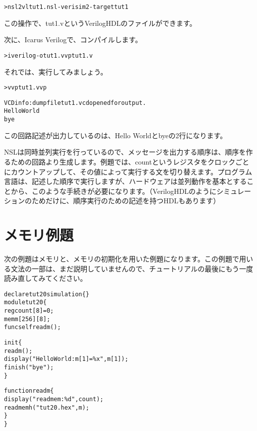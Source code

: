 \begin{reviewcmd}
\begin{alltt}
\textgreater{} nsl2vl tut1.nsl -verisim2 -target tut1
\end{alltt}
\end{reviewcmd}

この操作で、tut1.vというVerilogHDLのファイルができます。

次に、Icarus Verilogで、コンパイルします。

\begin{reviewcmd}
\begin{alltt}
\textgreater{} iverilog -o tut1.vvp tut1.v
\end{alltt}
\end{reviewcmd}

それでは、実行してみましょう。

\begin{reviewcmd}
\begin{alltt}
\textgreater{} vvp tut1.vvp

VCD info: dumpfile tut1.vcd opened for output.
Hello World
bye
\end{alltt}
\end{reviewcmd}

この回路記述が出力しているのは、Hello Worldとbyeの2行になります。

NSLは同時並列実行を行っているので、メッセージを出力する順序は、順序を作るための回路より生成します。例題では、countというレジスタをクロックごとにカウントアップして、その値によって実行する文を切り替えます。プログラム言語は、記述した順序で実行しますが、ハードウェアは並列動作を基本とすることから、このような手続きが必要になります。（VerilogHDLのようにシミュレーションのためだけに、順序実行のための記述を持つHDLもあります）

\section{メモリ例題}

次の例題はメモリと、メモリの初期化を用いた例題になります。この例題で用いる文法の一部は、まだ説明していませんので、チュートリアルの最後にもう一度読み直してみてください。

\begin{reviewlist}
\begin{alltt}
declare tut20 simulation \{ \}
module tut20 \{
    reg count[8] = 0;
    mem m[256][8];
    func\textunderscore{}self readm();

    \textunderscore{}init \{
        readm();
        \textunderscore{}display("Hello World:m[1]=\%x", m[1]);
        \textunderscore{}finish("bye");
	\}

function readm \{
        \textunderscore{}display("readmem:\%d", count);
    \textunderscore{}readmemh("tut20.hex",m);
\}
\}
\end{alltt}
\end{reviewlist}

